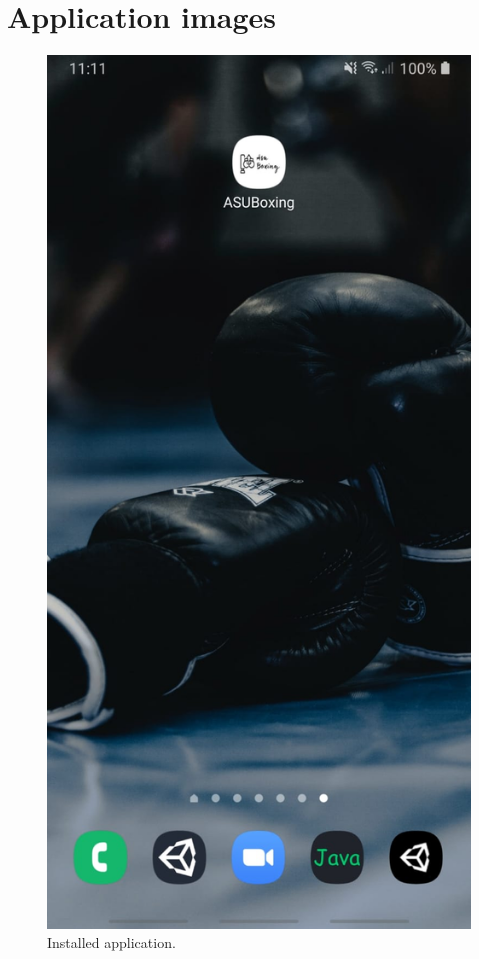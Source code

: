 \documentclass[a4paper,12pt]{report}
\begin{document}
\section{Application images}

\begin{figure}[ht] 
  \label{ fig7} 
  \begin{minipage}[b]{0.5\linewidth}
    \centering
    \includegraphics[width=.7\linewidth]{images/aplicationImages/application.jpeg} 
    \caption{Installed application.} 
    \vspace{4ex}
  \end{minipage}%
  \begin{minipage}[b]{0.5\linewidth}
    \centering

\end{minipage}
\end{figure}
\end{document}

